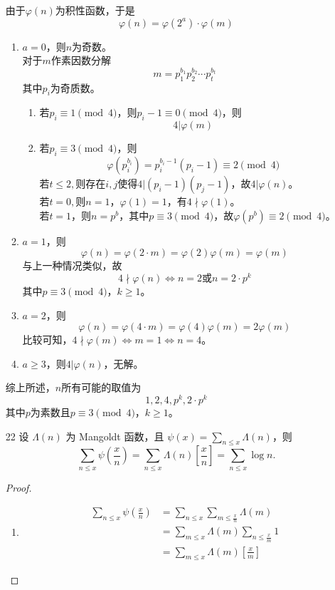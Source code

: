 \begin{enumerate}
\begin{solution}
      由于$\varphi(n)$为积性函数，于是
      \[\varphi(n)=\varphi(2^a)\cdot\varphi(m)\]
      \begin{enumerate}
        \item $a=0$，则$n$为奇数。\\
        对于$m$作素因数分解
        \[m=p_1^{b_1}p_2^{b_2}\cdots p_t^{b_t}\]
        其中$p_i$为奇质数。
        \begin{enumerate}
          \item 若$p_i\equiv 1\pmod{4}$，则$p_i-1\equiv 0\pmod{4}$，则
          \[4|\varphi(m)\]
          \item 若$p_i\equiv 3\pmod{4}$，则
          \[\varphi(p_i^{b_i})=p_i^{b_i-1}(p_i-1)\equiv 2\pmod{4}\]
          若$t \leq 2,$则存在$i,j$使得$4|(p_i-1)(p_j-1)$，故$4|\varphi(n)$。\\
          若$t=0,$则$n=1$，$\varphi(1)=1$，有$4\nmid\varphi(1)$。\\
          若$t=1$，则$n=p^b$，其中$p\equiv 3\pmod{4}$，故$\varphi(p^b)\equiv 2\pmod{4}$。
        \end{enumerate}
        \item $a=1$，则
        \[\varphi(n)=\varphi(2\cdot m)=\varphi(2)\varphi(m)=\varphi(m)\]
        与上一种情况类似，故
        \[4\nmid\varphi(n)\Longleftrightarrow n=2 \text{或}n=2\cdot p^k\]
        其中$p\equiv 3\pmod{4}$，$k\geq 1$。
        \item $a=2$，则
        \[\varphi(n)=\varphi(4\cdot m)=\varphi(4)\varphi(m)=2\varphi(m)\]
        比较可知，$4\nmid\varphi(m)\Longleftrightarrow m=1\Longleftrightarrow n=4$。
        \item $a\geq 3$，则$4|\varphi(n)$，无解。
      \end{enumerate}
      综上所述，$n$所有可能的取值为
      \[1,2,4,p^k,2\cdot p^k\]
      其中$p$为素数且$p\equiv 3\pmod{4}$，$k\geq 1$。
    \end{solution}
    \item[22] 设 $\Lambda(n)$ 为 Mangoldt 函数，且 $\psi(x) = \sum_{n\leq x} \Lambda(n)$，则
\[\sum_{n\leq x}\psi\left(\frac{x}{n}\right) = \sum_{n\leq x}\Lambda(n)\left[\frac{x}{n}\right] = \sum_{n\leq x}\log n.\]
    \begin{proof}
        \begin{enumerate}
            \item 
            \begin{align*}
                \sum\limits_{n\leq x}\psi\left(\frac{x}{n}\right) &= \sum\limits_{n\leq x}\sum\limits_{m\leq \frac{x}{n}}\Lambda(m)\\
                &= \sum\limits_{m\leq x}\Lambda(m)\sum\limits_{n\leq \frac{x}{m}}1\\
                &= \sum\limits_{m\leq x}\Lambda(m)\left[\frac{x}{m}\right]
            \end{align*}
            

\end{enumerate}
\end{proof}
\end{enumerate}
